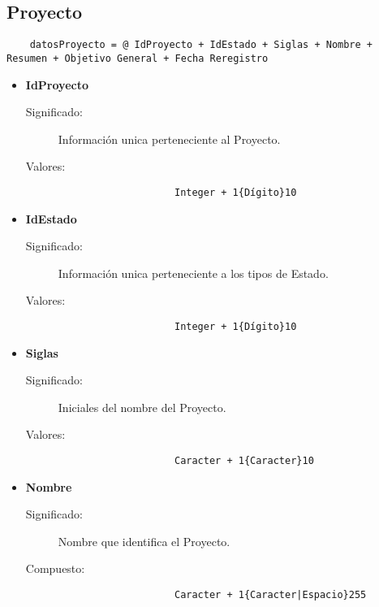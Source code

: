 \subsection{Proyecto}
\label{dd:Proyecto}
\begin{lstlisting}
	datosProyecto = @ IdProyecto + IdEstado + Siglas + Nombre + Resumen + Objetivo General + Fecha Reregistro		
\end{lstlisting}
\begin{itemize}
	\item	\textbf{IdProyecto}
		\begin{description}
			\item[Significado:]Información unica perteneciente al Proyecto.
			\item[Valores:]{\begin{lstlisting}
					Integer + 1{Dígito}10\end{lstlisting}}
		\end{description}

	\item	\textbf{IdEstado}
		\begin{description}
			\item[Significado:]Información unica perteneciente a los tipos de Estado.
			\item[Valores:]{\begin{lstlisting}
					Integer + 1{Dígito}10\end{lstlisting}}
		\end{description}

	\item	\textbf{Siglas}
		\begin{description}
			\item[Significado:]Iniciales del nombre del Proyecto.
			\item[Valores:]{\begin{lstlisting}
					Caracter + 1{Caracter}10\end{lstlisting}}
		\end{description}

	\item	\textbf{Nombre}
		\begin{description}
			\item[Significado:]Nombre que identifica el Proyecto.
			\item[Compuesto:]{\begin{lstlisting}
					Caracter + 1{Caracter|Espacio}255\end{lstlisting}}
		\end{description}


\end{itemize}
